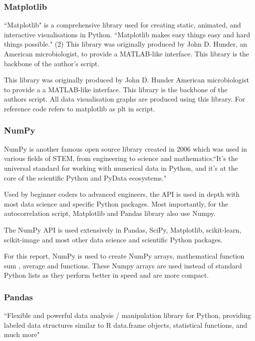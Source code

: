 \subsubsection{Matplotlib}
``Matplotlib" is a comprehensive library used for creating static, animated, and interactive visualisations in Python. ``Matplotlib makes easy things easy and hard things possible." (2)
This library was originally produced by John D. Hunder, an American microbiologist, to provide a MATLAB-like interface. This library is the backbone of the author's script. \cite{matplotlib}

This library was originally produced by John D. Hunder American microbiologist to provide a a MATLAB-like interface. 
This library is the backbone of the authors script. All data visualisation graphs are produced using this library. For reference code refers to matplotlib as plt in script. 

\subsubsection{NumPy}
NumPy is another famous open source library created in 2006 which was used in various fields of STEM, from engineering to science and mathematics.``It’s the universal standard for working with numerical data in Python, and it’s at the core of the scientific Python and PyData ecosystems." \cite{mhvk}

Used by beginner coders to advanced engineers, the API is used in depth with most data science and specific Python packages. Most importantly, for the autocorrelation script, Matplotlib and Pandas library also use Numpy.  

The NumPy API is used extensively in Pandas, SciPy, Matplotlib, scikit-learn, scikit-image and most other data science and scientific Python packages.

For this report, NumPy is used to create NumPy arrays, mathematical function sum \cite{mhvk}, average and functions. These Numpy arrays are used instead of standard Python lists as they perform better in speed and are more compact. 

\subsubsection{Pandas}

``Flexible and powerful data analysis / manipulation library for Python, providing labeled data structures similar to R data.frame objects, statistical functions, and much more" \cite{pandas}

